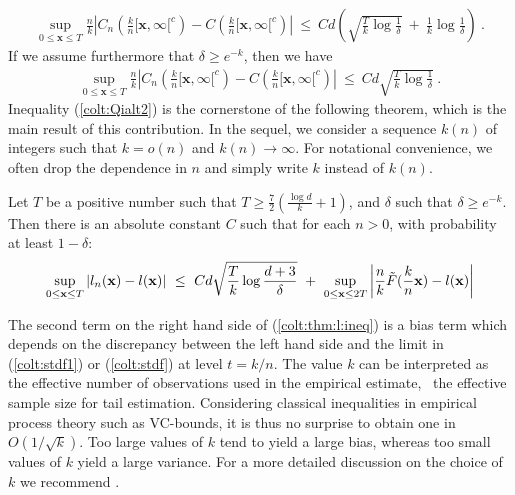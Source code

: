 \begin{align*}
\sup_{0 \le \mathbf{x} \le T} \frac{n}{k} \left | C_n(\frac{k}{n} [\mathbf{x},\infty[^c) - C(\frac{k}{n} [\mathbf{x},\infty[^c)  \right| ~\le~ C d\left(\sqrt{\frac{T}{k} \log{\frac{1}{\delta}}} ~+~ \frac{1}{k} \log \frac{1}{\delta} \right)~.
\end{align*}
If we assume furthermore that $\delta \ge e^{-k}$, then we have 
\begin{align}
\label{colt:Qialt2}
\sup_{0 \le \mathbf{x} \le T} \frac{n}{k} \left | C_n(\frac{k}{n} [\mathbf{x},\infty[^c) - C(\frac{k}{n} [\mathbf{x},\infty[^c)  \right| ~\le~ C d\sqrt{\frac{T}{k} \log{\frac{1}{\delta}}}~.
\end{align}
\noindent
Inequality (\ref{colt:Qialt2}) is the cornerstone of the following theorem, which is the main result of this contribution.
In the sequel, we consider a sequence $k(n)$ of integers such that $k=
o(n)$ and $k(n) \to \infty$. For notational convenience, we often 
drop the dependence in $n$ and simply write $k$ instead of $k(n)$. 
\begin{theorem}
\label{colt:thm:l}
Let $T$ be a positive number such that $T \ge \frac{7}{2}(\frac{\log d}{k} + 1)$, and $\delta$ such that $\delta \ge e^{-k}$. Then there is an absolute constant $C$ such that for each $n >0$, with probability at least $1-\delta$:
\begin{align}
\label{colt:thm:l:ineq}
\sup_{0 \le \mathbf{x} \le T} \left| l_n(\mathbf{x}) - l(\mathbf{x})
\right| ~\le~ Cd\sqrt{\frac{T}{k}\log\frac{d+3}{\delta}} ~+~ \sup_{0
  \le \mathbf{x} \le 2T}\left|\frac{n}{k} \tilde
  F(\frac{k}{n}\mathbf{x})- %
l(\mb x)\right|
\end{align}
\end{theorem}
The second term on the right hand side of (\ref{colt:thm:l:ineq}) is
a  bias term which depends on 
the  discrepancy between the left hand side and the limit in
  (\ref{colt:stdf1}) or (\ref{colt:stdf}) at level $t=k/n$. 
The value $k$ can be interpreted as the effective number of observations  used in the empirical estimate, \ie~the effective sample size for tail estimation. 
Considering classical inequalities in empirical process theory such as
VC-bounds, it is thus no surprise to obtain one  in $O(1/\sqrt k)$.
Too large values of $k$ tend to yield a large bias, whereas too small values of $k$ yield a large variance. For a more detailed discussion on the choice of $k$ we recommend \cite{ELL2009}. 


